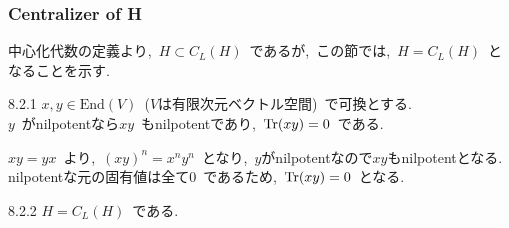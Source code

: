 \documentclass[uplatex,dvipdfmx]{jsarticle}
\begin{document}
\subsubsection{Centralizer of H}
中心化代数の定義より,~$H \subset C_L(H)$~であるが,~この節では,~$H = C_L(H)$~となることを示す.~
\begin{mylemma}{8.2.1}
    $x,y\in \text{End}(V)$~($V$は有限次元ベクトル空間)~で可換とする.\\
    $y$~がnilpotentなら$xy$~もnilpotentであり,~$\Tr(xy) = 0$~である.
\end{mylemma}
\begin{myproof}
    $xy = yx$~より,~$(xy)^n = x^n y^n$~となり,~$y$がnilpotentなので$xy$もnilpotentとなる.\\
    nilpotentな元の固有値は全て$0$~であるため,~$\Tr(xy) = 0$~となる.
\end{myproof}
\begin{myprop}{8.2.2}
    $H = C_L(H)$~である.
\end{myprop}
\end{document}
